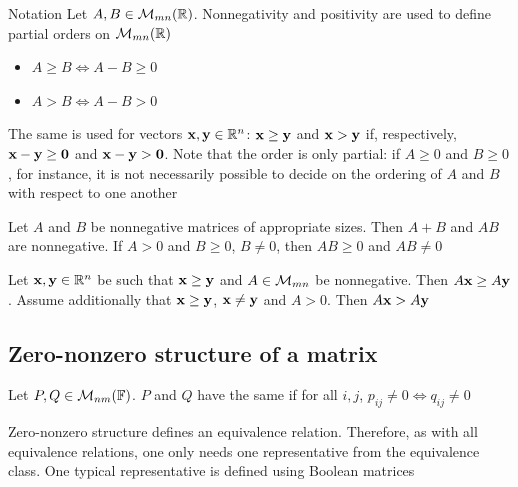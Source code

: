\documentclass[aspectratio=169]{beamer}
\begin{document}
\begin{frame}{Notation}
Let $A,B\in\mathcal{M}_{mn}(\mathbb{R})$. Nonnegativity and positivity are used to define partial orders on $\mathcal{M}_{mn}(\mathbb{R})$
\begin{itemize}
    \item $A\geq B \iff A-B\geq 0$
    \item $A>B \iff A-B >0$
\end{itemize}
The same is used for vectors $\mathbf{x},\mathbf{y}\in\mathbb{R}^n$: $\mathbf{x}\geq\mathbf{y}$ and $\mathbf{x}>\mathbf{y}$ if, respectively, $\bx-\by\geq\b0$ and $\bx-\by>\b0$. Note that the order is only partial: if $A\geq 0$ and $B\geq 0$, for instance, it is not necessarily possible to decide on the ordering of $A$ and $B$ with respect to one another
\end{frame}


\begin{frame}
\begin{theorem}\label{th:nonnegative_matrices_semigroup}
Let $A$ and $B$ be nonnegative matrices of appropriate sizes. Then $A+B$ and $AB$ are nonnegative. 
If $A>0$ and $B\geq 0$, $B\neq 0$, then $AB\geq 0$ and $AB\neq 0$
\end{theorem}
\vfill
\begin{corollary}\label{coro:nonnegativity_preserves_orientation}
Let $\mathbf{x},\mathbf{y}\in\mathbb{R}^n$ be such that $\mathbf{x}\geq\mathbf{y}$ and $A\in \mathcal{M}_{mn}$ be nonnegative. Then $A\mathbf{x}\geq A\mathbf{y}$. 
Assume additionally that $\mathbf{x}\geq\mathbf{y}$, $\mathbf{x}\neq\mathbf{y}$ and $A>0$. Then $A\mathbf{x}>A\mathbf{y}$
\end{corollary}
\end{frame}


\subsection{Zero-nonzero structure of a matrix}
\begin{frame}
\begin{definition}
Let $P,Q\in \mathcal{M}_{nm}(\mathbb{F})$. $P$ and $Q$ have the same  if for all $i,j$, $p_{ij}\neq 0 \iff q_{ij}\neq 0$
\end{definition}
\vfill
Zero-nonzero structure defines an equivalence relation. Therefore, as with all equivalence relations, one only needs one representative from the equivalence class. One typical representative is defined using Boolean matrices
\end{frame}
\end{document}

